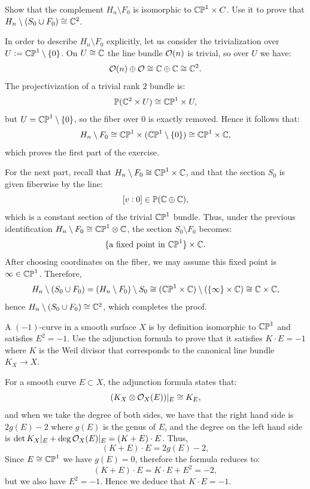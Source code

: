 \documentclass[11pt, a4paper]{article}
\renewcommand{\P}{\mathbb{P}}
\begin{document}
\begin{exercise}
  Show that the complement $H_n \setminus F_0$ is isomorphic to $\mathbb{CP}^1 \times C$.
  Use it to prove that $H_n \setminus (S_0 \cup F_0) \cong \mathbb{C}^2$.
\end{exercise}
\begin{solution}
  In order to describe $H_n \setminus F_0$ explicitly,
  let us consider the trivialization over $U := \mathbb{CP}^1 \setminus \left\{0\right\}$.
  On $U \cong \mathbb{C}$ the line bundle $\mathcal{O}(n)$ is trivial,
  so over $U$ we have:
  \[
    \mathcal{O}(n) \oplus \mathcal{O} \cong \mathbb{C} \oplus \mathbb{C} \cong \mathbb{C}^2.
  \]
  The projectivization of a trivial rank $2$ bundle is:
  \[
    \P(\C^2 \times U) \cong \CP^1 \times U,
  \]
  but $U = \mathbb{CP}^1 \setminus \left\{0\right\}$, so the fiber over $0$ is exactly removed. 
  Hence it follows that:
  \[
    H_n \setminus F_0 \cong 
    \mathbb{CP}^1 \times (\mathbb{CP}^1 \setminus \left\{0\right\}) \cong 
    \mathbb{CP}^1 \times \mathbb{C},
  \]
  which proves the first part of the exercise. 

  For the next part, recall that $H_n \setminus F_0 \cong \mathbb{CP}^1 \times \mathbb{C}$,
  and that the section $S_0$ is given fiberwise by the line:
  \[
    [v : 0] \in \P(\C \oplus \C),
  \]
  which is a constant section of the trivial $\mathbb{CP}^1$ bundle. 
  Thus, under the previous
  identification $H_n \setminus F_0 \cong \mathbb{CP}^1 \otimes \mathbb{C}$,
  the section $S_0 \setminus F_0$ becomes:
  \[
    \{\text{a fixed point in } \mathbb{CP}^1\} \times \mathbb{C}.
  \]
  After choosing coordinates on the fiber, we may assume this fixed
  point is $\infty \in \mathbb{CP}^1$. Therefore,
  \[
    H_n \setminus (S_0 \cup F_0) =
    (H_n \setminus F_0) \setminus S_0 \cong 
    (\mathbb{CP}^1 \times \mathbb{C}) \setminus (\left\{\infty\right\} \times \mathbb{C}) \cong
    \mathbb{C} \times \mathbb{C},
  \]
  hence $H_n \setminus (S_0 \cup F_0) \cong \mathbb{C}^2$, which completes the proof.
\end{solution}

\begin{exercise}
  A $(-1)$-curve in a smooth surface $X$ is by definition isomorphic to $\mathbb{CP}^1$
  and satisfies $E^2 = -1$.
  Use the adjunction formula to prove that it satisfies $K \cdot E = -1$
  where $K$ is the Weil divisor that corresponds to the canonical line
  bundle $K_X \to X$.
\end{exercise}
\begin{solution}
  For a smooth curve $E \subset X$, the adjunction formula states that:
  \[
    (K_X \otimes \mathcal{O}_X(E)) \vert_E \cong K_E,
  \]
  and when we take the degree of both sides,
  we have that the right hand side is $2g(E) - 2$ 
  where $g(E)$ is the genus of $E$,
  and the degree on the left
  hand side is $\det K_X \vert_E + \deg \mathcal{O}_X(E) \vert_E = (K + E) \cdot E$. 
  Thus,
  \[
    (K + E) \cdot E = 2g(E) - 2,
  \]
  Since $E \cong \mathbb{CP}^1$ we have $g(E) = 0$,
  therefore the formula reduces to:
  \[
    (K + E) \cdot E =
    K \cdot E + E^2 = -2,
  \]
  but we also have $E^2 = -1$.
  Hence we deduce that $K \cdot E = -1$.
\end{solution}
\end{document}
